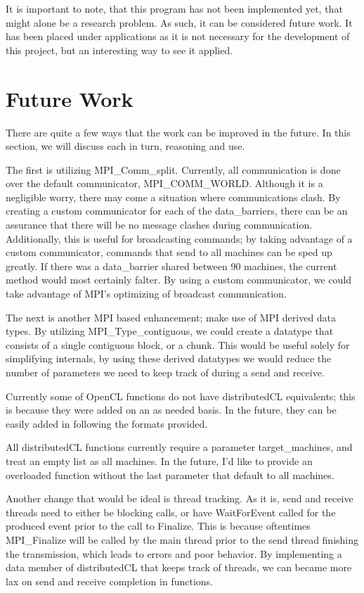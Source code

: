 \documentclass[../thesis.tex]{subfiles}
\begin{document}
    It is important to note, that this program has not been implemented yet, that might alone be a research problem. As such, it can be considered future work. It has been placed under applications as it is not necessary for the development of this project, but an interesting way to see it applied.

\section{Future Work}

There are quite a few ways that the work can be improved in the future. In this section, we will discuss each in turn, reasoning and use.

The first is utilizing MPI\_Comm\_split. Currently, all communication is done over the default communicator, MPI\_COMM\_WORLD. Although it is a negligible worry, there may come a situation where communications clash. By creating a custom communicator for each of the data\_barriers, there can be an assurance that there will be no message clashes during communication. Additionally, this is useful for broadcasting commands; by taking advantage of a custom communicator, commands that send to all machines can be sped up greatly. If there was a data\_barrier shared between 90 machines, the current method would most certainly falter. By using a custom communicator, we could take advantage of MPI's optimizing of broadcast communication.

The next is another MPI based enhancement; make use of MPI derived data types. By utilizing MPI\_Type\_contiguous, we could create a datatype that consists of a single contiguous block, or a chunk. This would be useful solely for simplifying internals, by using these derived datatypes we would reduce the number of parameters we need to keep track of during a send and receive.

Currently some of OpenCL functions do not have distributedCL equivalents; this is because they were added on an as needed basis. In the future, they can be easily added in following the formats provided.

All distributedCL functions currently require a parameter target\_machines, and treat an empty list as all machines. In the future, I'd like to provide an overloaded function without the last parameter that default to all machines.

Another change that would be ideal is thread tracking. As it is, send and receive threads need to either be blocking calls, or have WaitForEvent called for the produced event prior to the call to Finalize. This is because oftentimes MPI\_Finalize will be called by the main thread prior to the send thread finishing the transmission, which leads to errors and poor behavior. By implementing a data member of distributedCL that keeps track of threads, we can became more lax on send and receive completion in functions.
\end{document}
